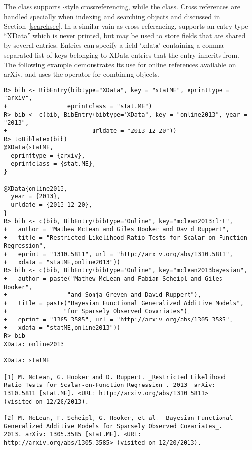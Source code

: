 \documentclass[article]{jss}\usepackage[]{graphicx}\usepackage[]{color}
\makeatletter
\newenvironment{kframe}{%
 \def\at@end@of@kframe{}%
 \ifinner\ifhmode%
  \def\at@end@of@kframe{\end{minipage}}%
  \begin{minipage}{\columnwidth}%
 \fi\fi%
 \def\FrameCommand##1{\hskip\@totalleftmargin \hskip-\fboxsep
 \colorbox{shadecolor}{##1}\hskip-\fboxsep
     \hskip-\linewidth \hskip-\@totalleftmargin \hskip\columnwidth}%
 \MakeFramed {\advance\hsize-\width
   \@totalleftmargin\z@ \linewidth\hsize
   \@setminipage}}%
 {\par\unskip\endMakeFramed%
 \at@end@of@kframe}
\newenvironment{knitrout}{}{} %
\makeatother
\begin{document}
The  class supports \Bibtex{}-style crossreferencing, while the  class.  Cross references are handled specially when indexing and searching  objects and discussed in Section~\ref{searchsec}.  In a similar vain as cross-referencing, \Biblatex{} supports an entry type ``XData'' which is never printed, but may be used to store fields that are shared by several entries.  Entries can specify a field `xdata' containing a comma separated list of keys belonging to XData entries that the entry inherits from.  The following example demonstrates its use for online references available on arXiv, and uses the  operator for combining  objects.
\begin{knitrout}
\color{fgcolor}\begin{kframe}
\begin{verbatim}
R> bib <- BibEntry(bibtype="XData", key = "statME", eprinttype = "arxiv", 
+                 eprintclass = "stat.ME")
R> bib <- c(bib, BibEntry(bibtype="XData", key = "online2013", year = "2013", 
+                        urldate = "2013-12-20"))
R> toBiblatex(bib)
@XData{statME,
  eprinttype = {arxiv},
  eprintclass = {stat.ME},
}

@XData{online2013,
  year = {2013},
  urldate = {2013-12-20},
}
R> bib <- c(bib, BibEntry(bibtype="Online", key="mclean2013rlrt", 
+   author = "Mathew McLean and Giles Hooker and David Ruppert",
+   title = "Restricted Likelihood Ratio Tests for Scalar-on-Function Regression",
+   eprint = "1310.5811", url = "http://arxiv.org/abs/1310.5811",
+   xdata = "statME,online2013"))
R> bib <- c(bib, BibEntry(bibtype="Online", key="mclean2013bayesian", 
+   author = paste("Mathew McLean and Fabian Scheipl and Giles Hooker",
+                 "and Sonja Greven and David Ruppert"), 
+   title = paste("Bayesian Functional Generalized Additive Models", 
+                "for Sparsely Observed Covariates"),
+   eprint = "1305.3585", url = "http://arxiv.org/abs/1305.3585",
+   xdata = "statME,online2013"))
R> bib
XData: online2013

XData: statME

[1] M. McLean, G. Hooker and D. Ruppert. _Restricted Likelihood
Ratio Tests for Scalar-on-Function Regression_. 2013. arXiv:
1310.5811 [stat.ME]. <URL: http://arxiv.org/abs/1310.5811>
(visited on 12/20/2013).

[2] M. McLean, F. Scheipl, G. Hooker, et al. _Bayesian Functional
Generalized Additive Models for Sparsely Observed Covariates_.
2013. arXiv: 1305.3585 [stat.ME]. <URL:
http://arxiv.org/abs/1305.3585> (visited on 12/20/2013).
\end{verbatim}
\end{kframe}
\end{knitrout}
\end{document}
